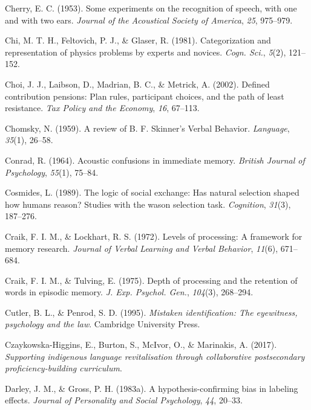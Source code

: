 \documentclass[
]{krantz}
\newlength{\cslhangindent}
\newenvironment{CSLReferences}[2] %
 {\begin{list}{}{%
  \setlength{\itemindent}{0pt}
  \setlength{\leftmargin}{0pt}
  \setlength{\parsep}{0pt}
  \ifodd #1
   \setlength{\leftmargin}{\cslhangindent}
   \setlength{\itemindent}{-1\cslhangindent}
  \fi
  \setlength{\itemsep}{#2\baselineskip}}}
 {\end{list}}
\begin{document}
\begin{CSLReferences}{1}{0}
Cherry, E. C. (1953). Some experiments on the recognition of speech, with one and with two ears. \emph{Journal of the Acoustical Society of America}, \emph{25}, 975--979.

Chi, M. T. H., Feltovich, P. J., \& Glaser, R. (1981). Categorization and representation of physics problems by experts and novices. \emph{Cogn. Sci.}, \emph{5}(2), 121--152.

Choi, J. J., Laibson, D., Madrian, B. C., \& Metrick, A. (2002). Defined contribution pensions: Plan rules, participant choices, and the path of least resistance. \emph{Tax Policy and the Economy}, \emph{16}, 67--113.

Chomsky, N. (1959). A review of {B}. {F}. {S}kinner's {V}erbal {B}ehavior. \emph{Language}, \emph{35}(1), 26--58.

Conrad, R. (1964). Acoustic confusions in immediate memory. \emph{British Journal of Psychology}, \emph{55}(1), 75--84.

Cosmides, L. (1989). The logic of social exchange: Has natural selection shaped how humans reason? Studies with the wason selection task. \emph{Cognition}, \emph{31}(3), 187--276.

Craik, F. I. M., \& Lockhart, R. S. (1972). Levels of processing: A framework for memory research. \emph{Journal of Verbal Learning and Verbal Behavior}, \emph{11}(6), 671--684.

Craik, F. I. M., \& Tulving, E. (1975). Depth of processing and the retention of words in episodic memory. \emph{J. Exp. Psychol. Gen.}, \emph{104}(3), 268--294.

Cutler, B. L., \& Penrod, S. D. (1995). \emph{Mistaken identification: The eyewitness, psychology and the law}. Cambridge University Press.

Czaykowska-Higgins, E., Burton, S., McIvor, O., \& Marinakis, A. (2017). \emph{Supporting indigenous language revitalisation through collaborative postsecondary proficiency-building curriculum}.

Darley, J. M., \& Gross, P. H. (1983a). A hypothesis-confirming bias in labeling effects. \emph{Journal of Personality and Social Psychology}, \emph{44}, 20--33.


\end{CSLReferences}
\end{document}
